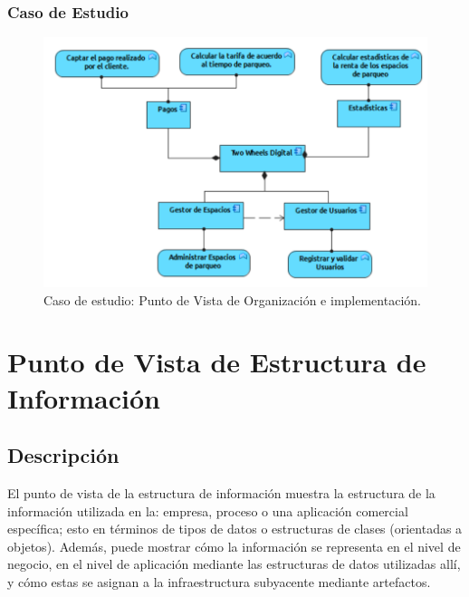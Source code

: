 \subsubsection{Caso de Estudio}


\begin{figure}[H]
	\centering
	\includegraphics[width=1.0\textwidth]{imagenes/Caso_Estudio/Tecnologia/ComAplicacion.PDF}
	\caption{Caso de estudio: Punto de Vista de Organización e implementación.}
	\label{fig:gap_analysis}
\end{figure}


\section{Punto de Vista de Estructura de Información}
\subsection{Descripción}
El punto de vista de la estructura de información muestra la estructura de la información utilizada en la: empresa, proceso o una aplicación comercial específica; esto en términos de tipos de datos o estructuras de clases (orientadas a objetos). Además, puede mostrar cómo la información se representa en el nivel de negocio, en el nivel de aplicación mediante las estructuras de datos utilizadas allí, y cómo estas se asignan a la infraestructura subyacente mediante artefactos.

